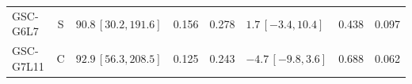 \documentclass[10pt,a4paper]{article}
\begin{document}
\begin{longtable}{lcp{37mm}rrp{37mm}rr}
GSC-G6L7 & S & \(90.8\,[30.2,191.6]\) & 0.156 & 0.278 & \(1.7\,[-3.4,10.4]\) & 0.438 & 0.097\\
GSC-G7L11 & C & \(92.9\,[56.3,208.5]\) & 0.125 & 0.243 & \(-4.7\,[-9.8,3.6]\) & 0.688 & 0.062\\

\end{longtable}
\end{document}
